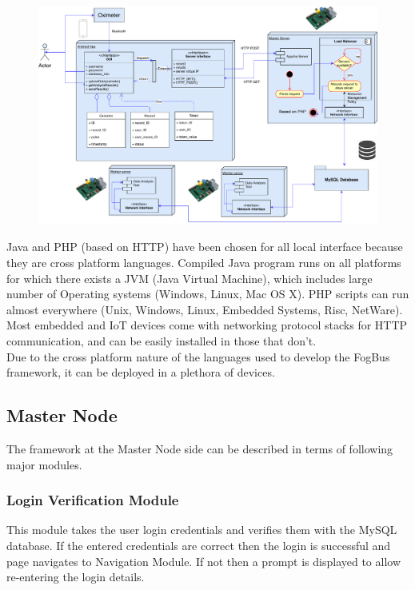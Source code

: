 \documentclass[10pt,journal,compsoc]{IEEEtran}
\begin{document}
\begin{figure}[h]
\centering
\includegraphics[width=17cm]{model-with-interface}
\end{figure}

Java and PHP (based on HTTP) have been chosen for all local interface because they are cross platform languages. Compiled Java program runs on all platforms for which there exists a JVM (Java Virtual Machine), which includes large number of Operating systems (Windows, Linux, Mac OS X). PHP scripts can run almost everywhere (Unix, Windows, Linux, Embedded Systems, Risc, NetWare). Most embedded and IoT devices come with networking protocol stacks for HTTP communication, and can be easily installed in those that don't. \\
Due to the cross platform nature of the languages used to develop the FogBus framework, it can be deployed in a plethora of devices.

\subsection{Master Node}

The framework at the Master Node side can be described in terms of following major modules.

\subsubsection{Login Verification Module}
This module takes the user login credentials and verifies them with the MySQL database. If the entered credentials are correct then the login is successful and page navigates to Navigation Module. If not then a prompt is displayed to allow re-entering the login details. 
\end{document}
